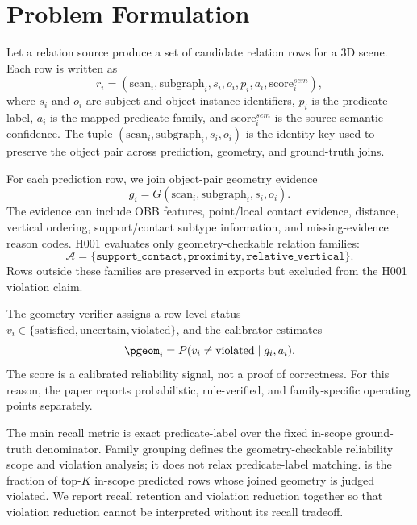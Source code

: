 \section{Problem Formulation}

Let a relation source produce a set of candidate relation rows for a 3D scene.
Each row is written as
\begin{equation}
r_i = (\mathrm{scan}_i,\mathrm{subgraph}_i,s_i,o_i,p_i,a_i,\mathrm{score}^{sem}_i),
\end{equation}
where $s_i$ and $o_i$ are subject and object instance identifiers, $p_i$ is the
predicate label, $a_i$ is the mapped predicate family, and
$\mathrm{score}^{sem}_i$ is the source semantic confidence. The tuple
$(\mathrm{scan}_i,\mathrm{subgraph}_i,s_i,o_i)$ is the identity key used to
preserve the object pair across prediction, geometry, and ground-truth joins.

For each prediction row, we join object-pair geometry evidence
\begin{equation}
g_i = G(\mathrm{scan}_i,\mathrm{subgraph}_i,s_i,o_i).
\end{equation}
The evidence can include OBB features, point/local contact evidence, distance,
vertical ordering, support/contact subtype information, and missing-evidence
reason codes. H001 evaluates only geometry-checkable relation families:
\begin{equation}
\mathcal{A}=\{\texttt{support\_contact},\texttt{proximity},\texttt{relative\_vertical}\}.
\end{equation}
Rows outside these families are preserved in exports but excluded from the H001
violation claim.

The geometry verifier assigns a row-level status
$v_i \in \{\mathrm{satisfied},\mathrm{uncertain},\mathrm{violated}\}$, and the
calibrator estimates
\begin{equation}
\pgeom_i = P(v_i \neq \mathrm{violated} \mid g_i,a_i).
\end{equation}
The score is a calibrated reliability signal, not a proof of correctness. For
this reason, the paper reports probabilistic, rule-verified, and
family-specific operating points separately.

The main recall metric is exact predicate-label  over the fixed in-scope
ground-truth denominator. Family grouping defines the geometry-checkable
reliability scope and violation analysis; it does not relax predicate-label
matching.  is the fraction of top-$K$ in-scope predicted rows whose
joined geometry is judged violated. We report recall retention and violation
reduction together so that violation reduction cannot be interpreted without
its recall tradeoff.

